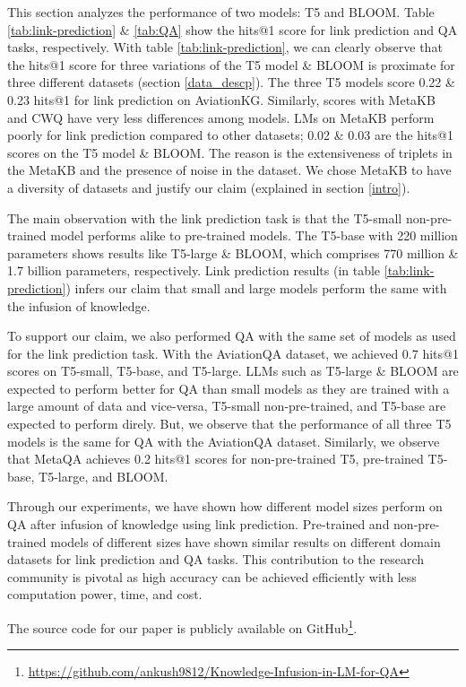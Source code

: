 \documentclass[11pt]{article}
\begin{document}
This section analyzes the performance of two models: T5 and BLOOM. Table \ref{tab:link-prediction} \& \ref{tab:QA} show the hits@1 score for link prediction and QA tasks, respectively. With table \ref{tab:link-prediction}, we can clearly observe that the hits@1 score for three variations of the T5 model \& BLOOM is proximate for three different datasets (section \ref{data_descp}). The three T5 models score 0.22 \& 0.23 hits@1 for link prediction on AviationKG. Similarly, scores with MetaKB and CWQ have very less differences among models. LMs on MetaKB perform poorly for link prediction compared to other datasets; 0.02 \& 0.03 are the hits@1 scores on the T5 model \& BLOOM. The reason is the extensiveness of triplets in the MetaKB and the presence of noise in the dataset. We chose MetaKB to have a diversity of datasets and justify our claim (explained in section \ref{intro}).
\par
The main observation with the link prediction task is that the T5-small non-pre-trained model performs alike to pre-trained models. The T5-base with 220 million parameters shows results like T5-large \& BLOOM, which comprises 770 million \& 1.7 billion parameters, respectively. 
Link prediction results (in table \ref{tab:link-prediction}) infers our claim that small and large models perform the same with the infusion of knowledge. 
\par
To support our claim, we also performed QA with the same set of models as used for the link prediction task. With the AviationQA dataset, we achieved 0.7 hits@1 scores on T5-small, T5-base, and T5-large. LLMs such as T5-large \& BLOOM are expected to perform better for QA than small models as they are trained with a large amount of data and vice-versa, T5-small non-pre-trained, and T5-base are expected to perform direly. But, we observe that the performance of all three T5 models is the same for QA with the AviationQA dataset. Similarly, we observe that MetaQA achieves 0.2 hits@1 scores for non-pre-trained T5, pre-trained T5-base, T5-large, and BLOOM.
\par
Through our experiments, we have shown how different model sizes perform on QA after infusion of knowledge using link prediction. Pre-trained and non-pre-trained models of different sizes have shown similar results on different domain datasets for link prediction and QA tasks. 
This contribution to the research community is pivotal as high accuracy can be achieved efficiently with less computation power, time, and cost.
\par
The source code for our paper is publicly available on GitHub\footnote{\url{https://github.com/ankush9812/Knowledge-Infusion-in-LM-for-QA}}. 
\end{document}
